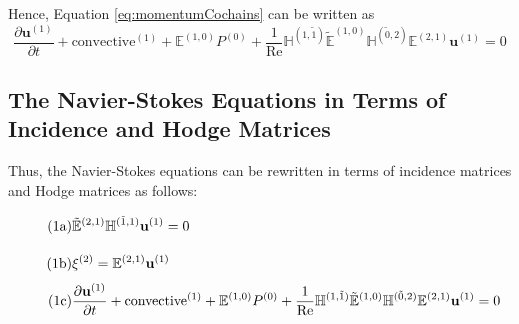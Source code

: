 Hence, Equation \ref{eq:momentumCochains} can be written as
\begin{equation}
    \frac{\partial \mathbf{u}^{(1)}}{\partial t} + \text{convective}^{(1)} + \mathbb{E}^{(1,0)} P^{(0)} + \frac{1}{\text{Re}} \mathbb{H}^{(1,\tilde{1})} \tilde{\mathbb{E}}^{(1,0)} \mathbb{H}^{(\tilde{0},2)} \mathbb{E}^{(2,1)} \mathbf{u}^{(1)} = 0
\end{equation}

\subsection{The Navier-Stokes Equations in Terms of Incidence and Hodge Matrices}

Thus, the Navier-Stokes equations can be rewritten in terms of incidence matrices and Hodge matrices as follows:
\begin{align}
    \stepcounter{equation}
    \tag{{\theequation}a}
    &\tilde{\mathbb{E}}^{(2,1)} \mathbb{H}^{(\tilde{1},1)} \mathbf{u}^{(1)} = 0 \vphantom{\frac{\partial^{(1)}}{\partial}} \\
    \tag{{\theequation}b}
    &\xi^{(2)} = \mathbb{E}^{(2,1)} \mathbf{u}^{(1)} \vphantom{\frac{\partial^{(1)}}{\partial}} \\
    \tag{{\theequation}c}
    &\frac{\partial \mathbf{u}^{(1)}}{\partial t} + \text{convective}^{(1)} + \mathbb{E}^{(1,0)} P^{(0)} + \frac{1}{\text{Re}} \mathbb{H}^{(1,\tilde{1})} \tilde{\mathbb{E}}^{(1,0)} \mathbb{H}^{(\tilde{0},2)} \mathbb{E}^{(2,1)} \mathbf{u}^{(1)} = 0
\end{align}
